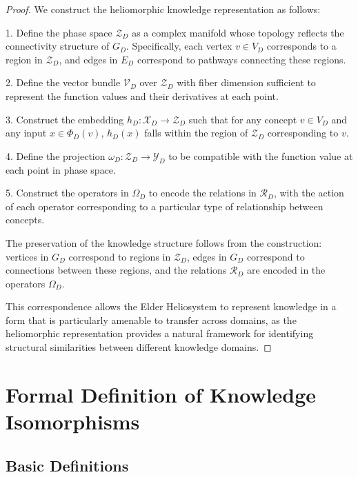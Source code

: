\begin{proof}
We construct the heliomorphic knowledge representation as follows:

1. Define the phase space $\mathcal{Z}_D$ as a complex manifold whose topology reflects the connectivity structure of $G_D$. Specifically, each vertex $v \in V_D$ corresponds to a region in $\mathcal{Z}_D$, and edges in $E_D$ correspond to pathways connecting these regions.

2. Define the vector bundle $\mathcal{V}_D$ over $\mathcal{Z}_D$ with fiber dimension sufficient to represent the function values and their derivatives at each point.

3. Construct the embedding $h_D: \mathcal{X}_D \to \mathcal{Z}_D$ such that for any concept $v \in V_D$ and any input $x \in \Phi_D(v)$, $h_D(x)$ falls within the region of $\mathcal{Z}_D$ corresponding to $v$.

4. Define the projection $\omega_D: \mathcal{Z}_D \to \mathcal{Y}_D$ to be compatible with the function value at each point in phase space.

5. Construct the operators in $\Omega_D$ to encode the relations in $\mathcal{R}_D$, with the action of each operator corresponding to a particular type of relationship between concepts.

The preservation of the knowledge structure follows from the construction: vertices in $G_D$ correspond to regions in $\mathcal{Z}_D$, edges in $G_D$ correspond to connections between these regions, and the relations $\mathcal{R}_D$ are encoded in the operators $\Omega_D$.

This correspondence allows the Elder Heliosystem to represent knowledge in a form that is particularly amenable to transfer across domains, as the heliomorphic representation provides a natural framework for identifying structural similarities between different knowledge domains.
\end{proof}

\section{Formal Definition of Knowledge Isomorphisms}

\subsection{Basic Definitions}

